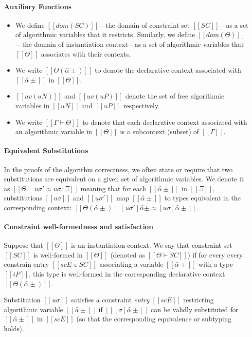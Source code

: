 \paragraph*{Auxiliary Functions}
\begin{itemize}
  \item
    We define $[[dom(SC)]]$---the domain of constraint set $[[SC]]$---as a set of
    algorithmic variables that it restricts. Similarly, we define $[[dom(Θ)]]$---the
    domain of instantiation context---as a set of algorithmic variables that
    $[[Θ]]$ associates with their contexts.  
  \item We write $[[Θ(α̂±)]]$ to denote the
    declarative context associated with $[[α̂±]]$ in $[[Θ]]$. 
  \item $[[uv(uN)]]$ and $[[uv(uP)]]$ denote the set of free algorithmic variables in $[[uN]]$ and
    $[[uP]]$ respectively.
  \item We write $[[Γ ⊢ Θ]]$ to denote that each
    declarative context associated with an algorithmic variable in $[[Θ]]$ is 
    a subcontext (subset) of $[[Γ]]$.
\end{itemize}

\paragraph*{Equivalent Substitutions}
In the proofs of the algorithm correctness, 
we often state or require that two substitutions are equivalent
on a given set of algorithmic variables.
We denote it as $[[Θ ⊢ uσ' ≈ uσ : Ξ]]$ meaning that
for each $[[α̂±]]$ in $[[Ξ]]$, substitutions $[[uσ]]$ and $[[uσ']]$
map $[[α̂±]]$ to types equivalent in the corresponding context:
$[[ Θ(α̂±) ⊢ [uσ']α̂± ≈ [uσ]α̂± ]]$.



\paragraph*{Constraint well-formedness and satisfaction}
Suppose that $[[Θ]]$ is an instantiation context. 
We say that constraint set $[[SC]]$ is well-formed in $[[Θ]]$ 
(denoted as $[[Θ ⊢ SC]]$) 
if for every every constrain entry $[[scE ∊ SC]]$
associating a variable $[[α̂±]]$ with a type $[[iP]]$,
this type is well-formed in the corresponding declarative context $[[Θ(α̂±)]]$.

Substitution $[[uσ]]$ satisfies a constraint \emph{entry} $[[scE]]$ restricting
algorithmic variable $[[α̂±]]$ if
$[[ [σ]α̂± ]]$ can be validly substituted for $[[α̂±]]$ in $[[scE]]$ 
(so that the corresponding equivalence or subtyping holds).

